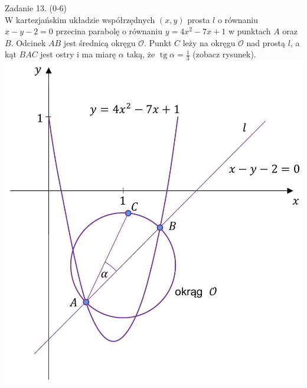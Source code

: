 \documentclass[10pt]{article}
\begin{document}
Zadanie 13. (0-6)\\
W kartezjańskim układzie współrzędnych \((x, y)\) prosta \(l\) o równaniu \(x-y-2=0\) przecina parabolę o równaniu \(y=4 x^{2}-7 x+1\) w punktach \(A\) oraz \(B\). Odcinek \(A B\) jest średnicą okręgu \(\mathcal{O}\). Punkt \(C\) leży na okręgu \(\mathcal{O}\) nad prostą \(l\), a kąt \(B A C\) jest ostry i ma miarę \(\alpha\) taką, że \(\operatorname{tg} \alpha=\frac{1}{3}\) (zobacz rysunek).\\
\includegraphics[max width=\textwidth, center]{2024_11_21_f1ecc00f5c4ab21f0d04g-22(1)}
\end{document}
